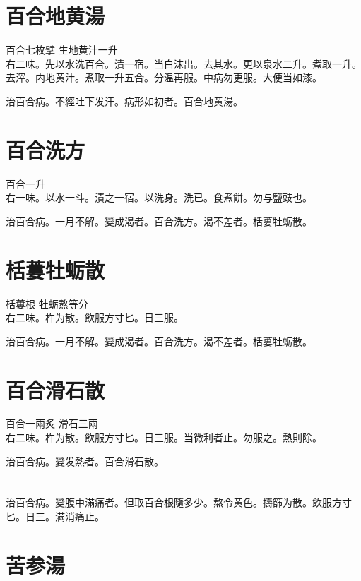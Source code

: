 \section{百合地黄湯}

百合{\scriptsize 七枚擘} 生地黄汁{\scriptsize 一升}\\
右二味。先以水洗百合。漬一宿。当白沫出。去其水。更以泉水二升。煮取一升。去滓。内地黄汁。煮取一升五合。分温再服。中病勿更服。大便当如漆。

治百合病。不經吐下发汗。病形如初者。百合地黄湯。

\section{百合洗方}

百合{\scriptsize 一升}\\
右一味。以水一斗。漬之一宿。以洗身。洗已。食煮餅。勿与鹽豉也。

治百合病。一月不解。變成渴者。百合洗方。渴不差者。栝蔞牡蛎散。

\section{栝蔞牡蛎散}

栝蔞根{ }牡蛎{\scriptsize 熬等分}\\
右二味。杵为散。飲服方寸匕。日三服。

治百合病。一月不解。變成渴者。百合洗方。渴不差者。栝蔞牡蛎散。

\section{百合滑石散}

百合{\scriptsize 一兩炙} 滑石{\scriptsize 三兩}\\
右二味。杵为散。飲服方寸匕。日三服。当微利者止。勿服之。熱則除。

治百合病。變发熱者。百合滑石散。

\section{}

治百合病。變腹中滿痛者。但取百合根隨多少。熬令黄色。擣篩为散。飲服方寸匕。日三。滿消痛止。

\section{苦参湯}

